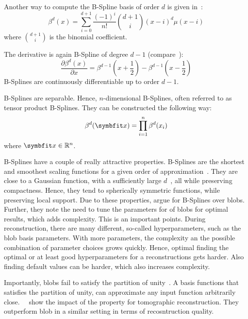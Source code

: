 Another way to compute the B-Spline basis of order \(d\) is given in~\cite{unser_fast_1991}:
\begin{equation}
	\beta^d(x) = \sum_{i=0}^{d+1} \frac{(-1)^i}{n!} \binom{d+1}{i}(x - i)^d\mu(x - i)
\end{equation}
where \(\binom{d+1}{i}\) is the binomial coefficient.

The derivative is again B-Spline of degree \(d-1\) (compare~\cite{unser_splines_1999}):
\begin{equation}
	\frac{\partial \beta^d(x)}{\partial x} = \beta^{d-1}\left(x + \frac{1}{2}\right) -
	\beta^{d-1}\left(x - \frac{1}{2}\right)
\end{equation}
B-Splines are continuously differentiable up to order \(d-1\).

B-Splines are separable. Hence, \(n\)-dimensional B-Splines, often referred to as tensor product
B-Splines. They can be constructed the following way:
\begin{equation}
	\beta^d(\mvec{x}) = \prod^n_{i=1} \beta^d(x_i)
\end{equation}
where \(\mvec{x} \in \mathbb{R}^n\).

B-Splines have a couple of really attractive properties. B-Splines are the shortest and smoothest
scaling functions for a given order of approximation~\cite{momey_b-spline_2012}. They are close to a
Gaussian function, with a sufficiently large \(d\)~\cite{momey_b-spline_2012}, all while preserving
compactness. Hence, they tend to spherically symmetric functions, while preserving local support.
Due to these properties, \citeauthor*{momey_new_2011}\cite{momey_new_2011} argue for B-Splines over
blobs. Further, they note the need to tune the parameters for of blobs for optimal results, which
adds complexity. This is an important points. During reconstruction, there are many different,
so-called hyperparameters, such as the blob basis parameters. With more parameters, the complexity
an the possible combination of parameter choices grows quickly. Hence, optimal finding the optimal
or at least good hyperparameters for a reconstructions gets harder. Also finding default values can
be harder, which also increases complexity.

Importantly, blobs fail to satisfy the partition of unity~\cite{nilchian_fast_2013}. A basis
functions that satisfies the partition of unity, can approximate any input function arbitrarily
close.~\citeauthor*{nilchian_fast_2013}~\cite{nilchian_fast_2013} show the impact of the property
for tomographic reconstruction. They outperform blob in a similar setting in terms of recosntruction
quality.

